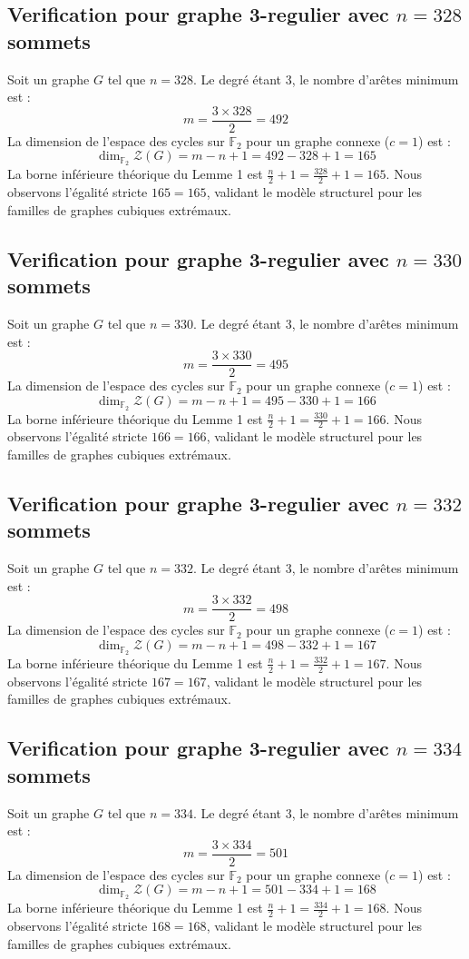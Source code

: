 \documentclass[11pt,a4paper]{article}
\begin{document}
\subsection{Verification pour graphe 3-regulier avec $n=328$ sommets}
Soit un graphe $G$ tel que $n = 328$. Le degré étant 3, le nombre d'arêtes minimum est :
$$ m = \frac{3 \times 328}{2} = 492 $$
La dimension de l'espace des cycles sur $\mathbb{F}_2$ pour un graphe connexe ($c=1$) est :
$$ \dim_{\mathbb{F}_2} \mathcal{Z}(G) = m - n + 1 = 492 - 328 + 1 = 165 $$
La borne inférieure théorique du Lemme 1 est $\frac{n}{2} + 1 = \frac{328}{2} + 1 = 165$.
Nous observons l'égalité stricte $165 = 165$, validant le modèle structurel pour les familles de graphes cubiques extrémaux.

\subsection{Verification pour graphe 3-regulier avec $n=330$ sommets}
Soit un graphe $G$ tel que $n = 330$. Le degré étant 3, le nombre d'arêtes minimum est :
$$ m = \frac{3 \times 330}{2} = 495 $$
La dimension de l'espace des cycles sur $\mathbb{F}_2$ pour un graphe connexe ($c=1$) est :
$$ \dim_{\mathbb{F}_2} \mathcal{Z}(G) = m - n + 1 = 495 - 330 + 1 = 166 $$
La borne inférieure théorique du Lemme 1 est $\frac{n}{2} + 1 = \frac{330}{2} + 1 = 166$.
Nous observons l'égalité stricte $166 = 166$, validant le modèle structurel pour les familles de graphes cubiques extrémaux.

\subsection{Verification pour graphe 3-regulier avec $n=332$ sommets}
Soit un graphe $G$ tel que $n = 332$. Le degré étant 3, le nombre d'arêtes minimum est :
$$ m = \frac{3 \times 332}{2} = 498 $$
La dimension de l'espace des cycles sur $\mathbb{F}_2$ pour un graphe connexe ($c=1$) est :
$$ \dim_{\mathbb{F}_2} \mathcal{Z}(G) = m - n + 1 = 498 - 332 + 1 = 167 $$
La borne inférieure théorique du Lemme 1 est $\frac{n}{2} + 1 = \frac{332}{2} + 1 = 167$.
Nous observons l'égalité stricte $167 = 167$, validant le modèle structurel pour les familles de graphes cubiques extrémaux.

\subsection{Verification pour graphe 3-regulier avec $n=334$ sommets}
Soit un graphe $G$ tel que $n = 334$. Le degré étant 3, le nombre d'arêtes minimum est :
$$ m = \frac{3 \times 334}{2} = 501 $$
La dimension de l'espace des cycles sur $\mathbb{F}_2$ pour un graphe connexe ($c=1$) est :
$$ \dim_{\mathbb{F}_2} \mathcal{Z}(G) = m - n + 1 = 501 - 334 + 1 = 168 $$
La borne inférieure théorique du Lemme 1 est $\frac{n}{2} + 1 = \frac{334}{2} + 1 = 168$.
Nous observons l'égalité stricte $168 = 168$, validant le modèle structurel pour les familles de graphes cubiques extrémaux.
\end{document}
